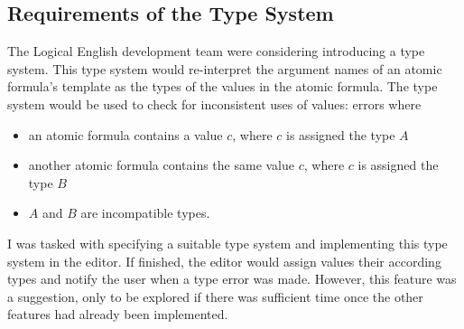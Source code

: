 \documentclass[../main.tex]{subfiles}
\begin{document}
\subsection{Requirements of the Type System}
The Logical English development team were considering introducing a type system. This type system would re-interpret the argument names of an atomic formula's template as the types of the values in the atomic formula. The type system would be used to check for inconsistent uses of values: errors where
\begin{itemize}
    \item an atomic formula contains a value $c$, where $c$ is assigned the type $A$
    \item another atomic formula contains the same value $c$, where $c$ is assigned the type $B$
    \item $A$ and $B$ are incompatible types.
\end{itemize}
I was tasked with specifying a suitable type system and implementing this type system in the editor. If finished, the editor would assign values their according types and notify the user when a type error was made. However, this feature was a suggestion, only to be explored if there was sufficient time once the other features had already been implemented. 
\end{document}
